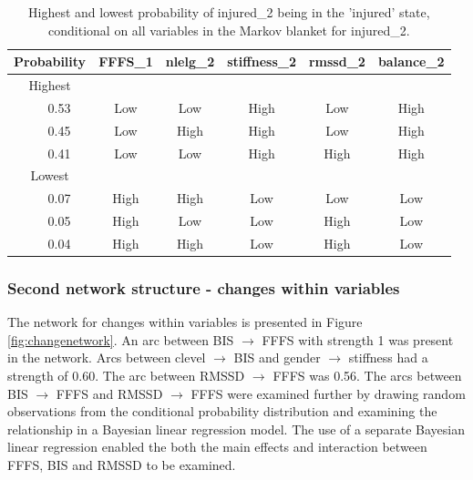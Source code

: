 \documentclass[
  english,
  man,floatsintext]{apa6}
\begin{document}
\begin{table}[H]

\begin{center}
\begin{threeparttable}

\caption{\label{tab:query4}Highest and lowest probability of injured\_2 being in the 'injured' state, conditional on all variables in the Markov blanket for injured\_2.}

\begin{tabular}{cccccc}
\toprule
Probability & \multicolumn{1}{c}{FFFS\_1} & \multicolumn{1}{c}{nlelg\_2} & \multicolumn{1}{c}{stiffness\_2} & \multicolumn{1}{c}{rmssd\_2} & \multicolumn{1}{c}{balance\_2}\\
\midrule
Highest &  &  &  &  & \\
\ \ \ 0.53 & Low & Low & High & Low & High\\
\ \ \ 0.45 & Low & High & High & Low & High\\
\ \ \ 0.41 & Low & Low & High & High & High\\
Lowest &  &  &  &  & \\
\ \ \ 0.07 & High & High & Low & Low & Low\\
\ \ \ 0.05 & High & Low & Low & High & Low\\
\ \ \ 0.04 & High & High & Low & High & Low\\
\bottomrule
\end{tabular}

\end{threeparttable}
\end{center}

\end{table}

\hypertarget{second-network-structure---changes-within-variables}{%
\subsubsection{Second network structure - changes within variables}\label{second-network-structure---changes-within-variables}}

The network for changes within variables is presented in Figure \ref{fig:changenetwork}.
An arc between BIS \(\rightarrow\) FFFS with strength 1 was present in the network.
Arcs between clevel \(\rightarrow\) BIS and gender \(\rightarrow\) stiffness had a strength of 0.60.
The arc between RMSSD \(\rightarrow\) FFFS was 0.56.
The arcs between BIS \(\rightarrow\) FFFS and RMSSD \(\rightarrow\) FFFS were examined further by drawing random observations from the conditional probability distribution and examining the relationship in a Bayesian linear regression model.
The use of a separate Bayesian linear regression enabled the both the main effects and interaction between FFFS, BIS and RMSSD to be examined.
\end{document}
